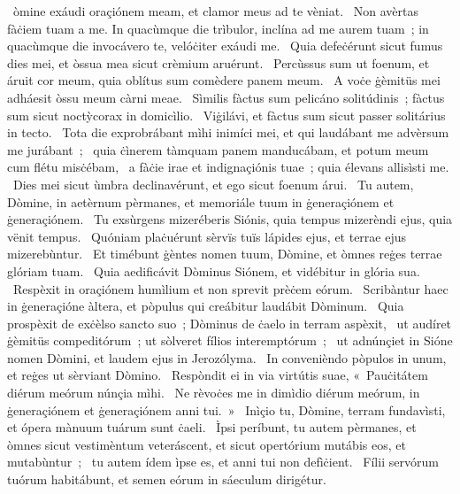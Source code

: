 \psalmChapterWithInscription{}
{ }
{%
~òmine exáudi oraçiónem meam, et clamor meus ad te vèniat. 
~Non avèrtas fàċiem tuam a me. In quacùmque die trìbulor, inclína ad me aurem tuam~; in quacùmque die invocávero te, velóċiter exáudi me. 
~Quia defeċérunt sicut fumus dies mei, et òssua mea sicut crèmium aruérunt. 
~Percùssus sum ut foenum, et áruit cor meum, quia oblítus sum comèdere panem meum. 
~A voċe ġèmitüs mei adháesit òssu meum càrni meae. 
~Sìmilis fàctus sum pelicáno solitúdinis~; fàctus sum sicut noctỳcorax in domicìlio. 
~Viġilávi, et fàctus sum sicut passer solitárius in tecto. 
~Tota die exprobrábant mìhi inimíci mei, et qui laudábant me advèrsum me jurábant~; 
~quia ċìnerem tàmquam panem manducábam, et potum meum cum flétu misċébam, 
~a fàċie irae et indignaçiónis tuae~; quia élevans allisìsti me. 
~Dies mei sicut ùmbra declinavérunt, et ego sicut foenum árui. 
~Tu autem, Dòmine, in aetèrnum pèrmanes, et memoriále tuum in ġeneraçiónem et ġeneraçiónem. 
~Tu exsùrgens mizeréberis Siónis, quia tempus mizerèndi ejus, quia vënit tempus. 
~Quóniam plaċuérunt sèrvïs tuïs lápides ejus, et terrae ejus mizerebùntur. 
~Et timébunt ġèntes nomen tuum, Dòmine, et òmnes reġes terrae glóriam tuam. 
~Quia aedificávit Dòminus Siónem, et vidébitur in glória sua. 
~Respèxit in oraçiónem humìlium et non sprevit prèċem eórum. 
~Scribàntur haec in ġeneraçióne àltera, et pòpulus qui creábitur laudábit Dòminum. 
~Quia prospèxit de exċèlso sancto suo~; Dòminus de ċaelo in terram aspèxit, 
~ut audíret ġèmitüs compeditórum~; ut sòlveret fílios interemptórum~; 
~ut adnúnçiet in Sióne nomen Dòmini, et laudem ejus in Jerozólyma. 
~In convenièndo pòpulos in unum, et reġes ut sèrviant Dòmino. 
~Respòndit ei in via virtútis suae, «~Pauċitátem diérum meórum núnçia mìhi.
~Ne rèvoċes me in dimìdio diérum meórum, in ġeneraçiónem et ġeneraçiónem anni tui.~»
~Inìçio tu, Dòmine, terram fundavìsti, et ópera mànuum tuárum sunt ċaeli. 
~Ìpsi períbunt, tu autem pèrmanes, et òmnes sicut vestimèntum veteráscent, et sicut opertórium mutábis eos, et mutabùntur~; 
~tu autem ídem ìpse es, et anni tui non defìċient. 
~Fílii servórum tuórum habitábunt, et semen eórum in sáeculum dirigétur. 
}
